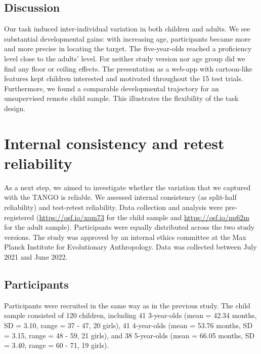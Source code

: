 \documentclass[
  man,floatsintext]{apa6}
\begin{document}
\hypertarget{discussion}{%
\subsection{Discussion}\label{discussion}}

Our task induced inter-individual variation in both children and adults.
We see substantial developmental gains: with increasing age, participants became more and more precise in locating the target.
The five-year-olds reached a proficiency level close to the adults' level.
For neither study version nor age group did we find any floor or ceiling effects.
The presentation as a web-app with cartoon-like features kept children interested and motivated throughout the 15 test trials.
Furthermore, we found a comparable developmental trajectory for an unsupervised remote child sample.
This illustrates the flexibility of the task design.

\hypertarget{internal-consistency-and-retest-reliability}{%
\section{Internal consistency and retest reliability}\label{internal-consistency-and-retest-reliability}}

As a next step, we aimed to investigate whether the variation that we captured with the TANGO is reliable.
We assessed internal consistency (as split-half reliability) and test-retest reliability.
Data collection and analysis were pre-registered (\url{https://osf.io/xqm73} for the child sample and \url{https://osf.io/nu62m} for the adult sample).
Participants were equally distributed across the two study versions.
The study was approved by an internal ethics committee at the Max Planck Institute for Evolutionary Anthropology.
Data was collected between July 2021 and June 2022.

\hypertarget{participants-1}{%
\subsection{Participants}\label{participants-1}}

Participants were recruited in the same way as in the previous study.
The child sample consisted of 120 children, including 41 3-year-olds (mean = 42.34 months, SD = 3.10, range = 37 - 47, 20 girls), 41 4-year-olds (mean = 53.76 months, SD = 3.15, range = 48 - 59, 21 girls), and 38 5-year-olds (mean = 66.05 months, SD = 3.40, range = 60 - 71, 19 girls).
\end{document}
